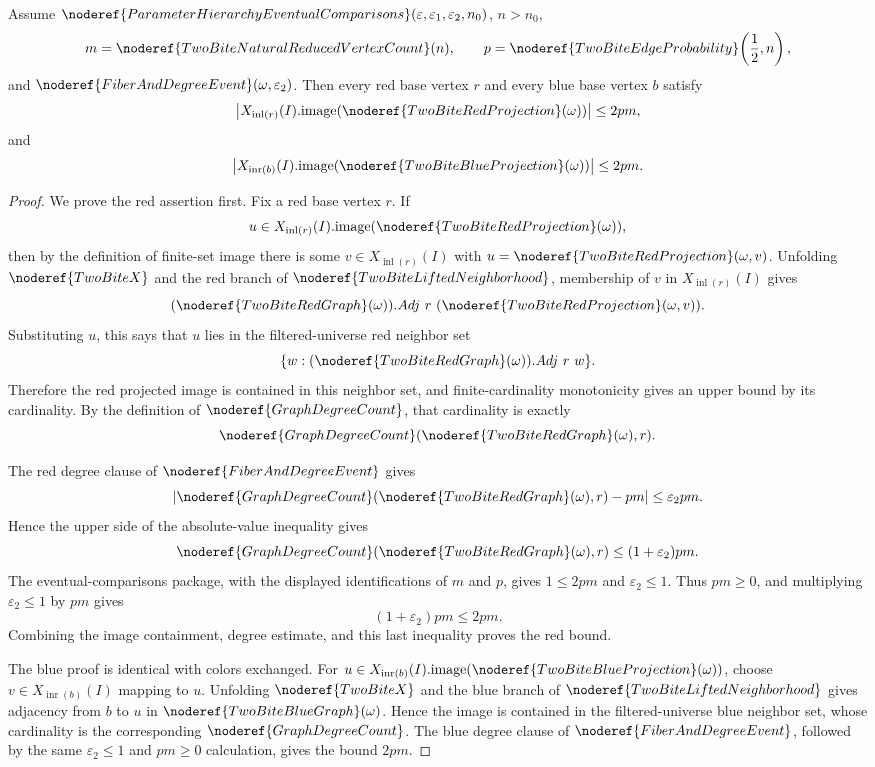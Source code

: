 \begin{helper}
Assume
\(\noderef{ParameterHierarchyEventualComparisons}
(\varepsilon,\varepsilon_1,\varepsilon_2,n_0)\), \(n>n_0\),
\[
m=\noderef{TwoBiteNaturalReducedVertexCount}(n),
\qquad
p=\noderef{TwoBiteEdgeProbability}\!\left(\frac12,n\right),
\]
and \(\noderef{FiberAndDegreeEvent}(\omega,\varepsilon_2)\).  Then every red
base vertex \(r\) and every blue base vertex \(b\) satisfy
\[
\left|
  X_{\operatorname{inl}(r)}(I).\mathrm{image}
    (\noderef{TwoBiteRedProjection}(\omega))
\right|
\le 2pm,
\]
and
\[
\left|
  X_{\operatorname{inr}(b)}(I).\mathrm{image}
    (\noderef{TwoBiteBlueProjection}(\omega))
\right|
\le 2pm.
\]
\end{helper}
\begin{proof}
We prove the red assertion first.  Fix a red base vertex \(r\).  If
\[
u\in X_{\operatorname{inl}(r)}(I).\mathrm{image}
  (\noderef{TwoBiteRedProjection}(\omega)),
\]
then by the definition of finite-set image there is some
\(v\in X_{\operatorname{inl}(r)}(I)\) with
\(u=\noderef{TwoBiteRedProjection}(\omega,v)\).  Unfolding
\(\noderef{TwoBiteX}\) and the red branch of
\(\noderef{TwoBiteLiftedNeighborhood}\), membership of \(v\) in
\(X_{\operatorname{inl}(r)}(I)\) gives
\[
(\noderef{TwoBiteRedGraph}(\omega)).Adj
  \ r\ (\noderef{TwoBiteRedProjection}(\omega,v)).
\]
Substituting \(u\), this says that \(u\) lies in the filtered-universe red
neighbor set
\[
\{w:(\noderef{TwoBiteRedGraph}(\omega)).Adj\ r\ w\}.
\]
Therefore the red projected image is contained in this neighbor set, and
finite-cardinality monotonicity gives an upper bound by its cardinality.  By
the definition of \(\noderef{GraphDegreeCount}\), that cardinality is exactly
\[
\noderef{GraphDegreeCount}(\noderef{TwoBiteRedGraph}(\omega),r).
\]

The red degree clause of \(\noderef{FiberAndDegreeEvent}\) gives
\[
\left|
  \noderef{GraphDegreeCount}(\noderef{TwoBiteRedGraph}(\omega),r)-pm
\right|\le \varepsilon_2pm.
\]
Hence the upper side of the absolute-value inequality gives
\[
\noderef{GraphDegreeCount}(\noderef{TwoBiteRedGraph}(\omega),r)
\le (1+\varepsilon_2)pm.
\]
The eventual-comparisons package, with the displayed identifications of
\(m\) and \(p\), gives \(1\le2pm\) and \(\varepsilon_2\le1\).  Thus
\(pm\ge0\), and multiplying \(\varepsilon_2\le1\) by \(pm\) gives
\[
(1+\varepsilon_2)pm\le2pm.
\]
Combining the image containment, degree estimate, and this last inequality
proves the red bound.

The blue proof is identical with colors exchanged.  For
\(u\in X_{\operatorname{inr}(b)}(I).\mathrm{image}
(\noderef{TwoBiteBlueProjection}(\omega))\), choose
\(v\in X_{\operatorname{inr}(b)}(I)\) mapping to \(u\).  Unfolding
\(\noderef{TwoBiteX}\) and the blue branch of
\(\noderef{TwoBiteLiftedNeighborhood}\) gives adjacency from \(b\) to \(u\) in
\(\noderef{TwoBiteBlueGraph}(\omega)\).  Hence the image is contained in the
filtered-universe blue neighbor set, whose cardinality is the corresponding
\(\noderef{GraphDegreeCount}\).  The blue degree clause of
\(\noderef{FiberAndDegreeEvent}\), followed by the same
\(\varepsilon_2\le1\) and \(pm\ge0\) calculation, gives the bound \(2pm\).
\end{proof}
